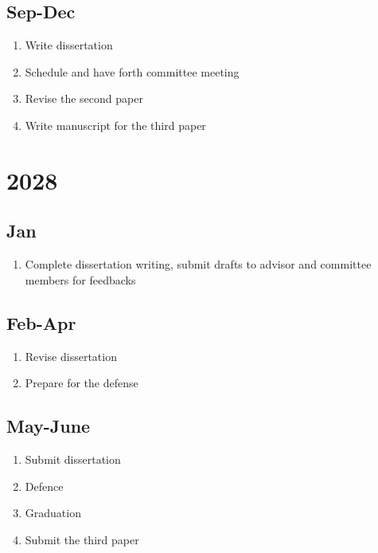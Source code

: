 \documentclass[12pt,letter]{article}
\begin{document}
\subsection{Sep-Dec}
\begin{enumerate}
	\item Write dissertation
	\item Schedule and have forth committee meeting
	\item Revise the second paper
	\item Write manuscript for the third paper
	\end{enumerate}		
\section{2028}
\subsection{Jan}
\begin{enumerate}
	\item Complete dissertation writing, submit drafts to advisor and committee members for feedbacks
	\end{enumerate}	
\subsection{Feb-Apr}
\begin{enumerate}
	\item Revise dissertation
	\item Prepare for the defense
	\end{enumerate}	
\subsection{May-June}
\begin{enumerate}
	\item Submit dissertation
	\item Defence
	\item Graduation
	\item Submit the third paper
	\end{enumerate}	
\end{document}
